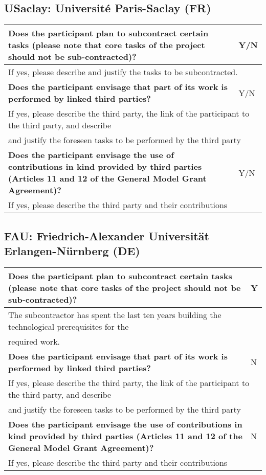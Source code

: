 \subsection{USaclay: Université Paris-Saclay (FR)}

\begin{longtable}{|p{}|p{}|}
\hline
{\bf Does the participant plan to subcontract certain tasks (please
  note that core tasks of the project should not be sub-contracted)?}
&
Y/N
\\
\hline
\multicolumn{2}{|l|}{
If yes, please describe and justify the tasks to be subcontracted.}
\\
\hline
{\bf Does the participant envisage that  part of its work is performed
  by linked third parties?}
&
Y/N
\\
\hline
\multicolumn{2}{|l|}{If yes, please describe the third party, the link of the
  participant to the third party, and describe}\\
\multicolumn{2}{|l|}{and justify the foreseen
tasks to be performed by the third party}
\\
\hline
{\bf Does the participant envisage the use of contributions in kind
provided by third parties (Articles 11 and 12 of the General Model
Grant Agreement)?}
&
Y/N
\\
\hline
\multicolumn{2}{|l|}{If yes, please describe the third party and their contributions}
\\
\hline
\end{longtable}

\subsection{FAU: Friedrich-Alexander Universität Erlangen-Nürnberg (DE)}

\begin{longtable}{|p{}|p{}|}
\hline
{\bf Does the participant plan to subcontract certain tasks (please
  note that core tasks of the project should not be sub-contracted)?}
&
Y
\\
\hline
\multicolumn{2}{|l|}{The subcontractor has spent the last ten years building the technological
  prerequisites for the}\\
\multicolumn{2}{|l|}{required work. }
\\
\hline
{\bf Does the participant envisage that  part of its work is performed
  by linked third parties?}
&
N
\\
\hline
\multicolumn{2}{|l|}{If yes, please describe the third party, the link of the
  participant to the third party, and describe}\\
\multicolumn{2}{|l|}{and justify the foreseen
tasks to be performed by the third party}
\\
\hline
{\bf Does the participant envisage the use of contributions in kind
provided by third parties (Articles 11 and 12 of the General Model
Grant Agreement)?}
&
N
\\
\hline
\multicolumn{2}{|l|}{If yes, please describe the third party and their contributions}
\\
\hline
\end{longtable}

